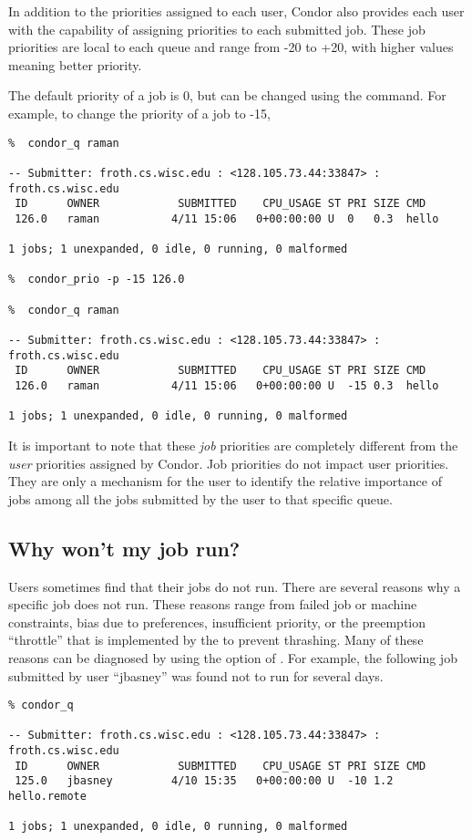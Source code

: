 In addition to the priorities assigned to each user, Condor also provides
each user with the capability of assigning priorities to each submitted job.
These job priorities are local to each queue and range from -20 to +20, with
higher values meaning better priority.

The default priority of a job is 0, but can be changed using the 
command.  For example, to change the priority of a job to -15,
\begin{verbatim}
%  condor_q raman

-- Submitter: froth.cs.wisc.edu : <128.105.73.44:33847> : froth.cs.wisc.edu
 ID      OWNER            SUBMITTED    CPU_USAGE ST PRI SIZE CMD               
 126.0   raman           4/11 15:06   0+00:00:00 U  0   0.3  hello             

1 jobs; 1 unexpanded, 0 idle, 0 running, 0 malformed

%  condor_prio -p -15 126.0

%  condor_q raman

-- Submitter: froth.cs.wisc.edu : <128.105.73.44:33847> : froth.cs.wisc.edu
 ID      OWNER            SUBMITTED    CPU_USAGE ST PRI SIZE CMD               
 126.0   raman           4/11 15:06   0+00:00:00 U  -15 0.3  hello             

1 jobs; 1 unexpanded, 0 idle, 0 running, 0 malformed
\end{verbatim}

It is important to note that these \emph{job} priorities are completely 
different from the \emph{user} priorities assigned by Condor.  Job priorities
do not impact user priorities.  They are only a mechanism for the user to
identify the relative importance of jobs among all the jobs submitted by the
user to that specific queue.

\subsection{Why won't my job run?}
Users sometimes find that their jobs do not run.  There are several reasons why
a specific job does not run.  These reasons range from failed job or machine
constraints, bias due to preferences, insufficient priority, or the preemption
``throttle'' that is implemented by the  to prevent
thrashing.  Many of these reasons can be diagnosed by using the 
option of .  For example, the following job submitted by user
``jbasney'' was found not to run for several days.
\begin{verbatim}
% condor_q

-- Submitter: froth.cs.wisc.edu : <128.105.73.44:33847> : froth.cs.wisc.edu
 ID      OWNER            SUBMITTED    CPU_USAGE ST PRI SIZE CMD               
 125.0   jbasney         4/10 15:35   0+00:00:00 U  -10 1.2  hello.remote      

1 jobs; 1 unexpanded, 0 idle, 0 running, 0 malformed
\end{verbatim}

